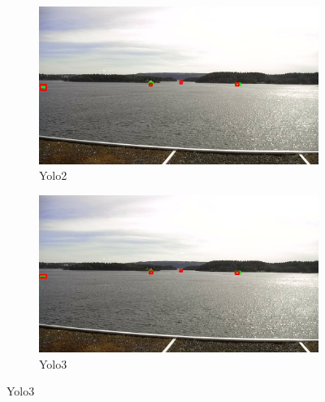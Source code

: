 \begin{figure}[h!]
\begin{subfigure}{.5\textwidth}
  \centering
  \includegraphics[width=0.9\linewidth]{results/case_buildings/yolo23/samemistake/yolo2/selected_08_07_frame10455.jpg}
  \caption{Yolo2}
\end{subfigure}%
\begin{subfigure}{.5\textwidth}
  \centering
  \includegraphics[width=.9\linewidth]{results/case_buildings/yolo23/samemistake/yolo3/selected_08_07_frame10455.jpg}
  \caption{Yolo3}
\end{subfigure}


\end{figure}
